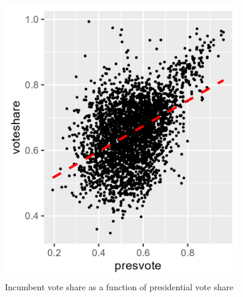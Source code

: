\documentclass[12pt,letterpaper]{article}
\begin{document}
  \begin{figure}
    \includegraphics[width=0.9\textwidth]{Graphics/vote_pres.png}
    \caption{Incumbent vote share as a function of presidential vote share}
    \label{fig:vote_pres}
  \end{figure}

\clearpage
\newpage	
\end{document}

